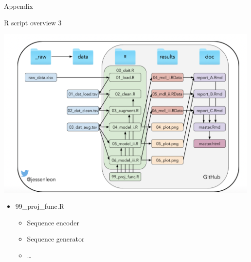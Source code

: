 \documentclass[ignorenonframetext,]{beamer}
\providecommand{\tightlist}{%
  \setlength{\itemsep}{0pt}\setlength{\parskip}{0pt}}
\begin{document}
\begin{frame}{Appendix}
\protect\hypertarget{appendix-2}{}

\begin{block}{R script overview 3}

\includegraphics[width=5.20833in,height=\textheight]{project_organisation.png}

\begin{itemize}
\tightlist
\item
  99\_proj\_func.R

  \begin{itemize}
  \tightlist
  \item
    Sequence encoder
  \item
    Sequence generator
  \item
    \ldots{}
  \end{itemize}
\end{itemize}

\end{block}

\end{frame}
\end{document}
